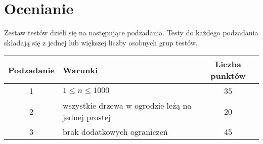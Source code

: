 \documentclass[10pt]{article}
\begin{document}

    \section*{Ocenianie}
        
    Zestaw testów dzieli się na następujące podzadania. Testy do każdego podzadania składają się z jednej lub większej liczby osobnych grup testów.
    
    \begin{center}
        \begin{tabular}{ |c|p{9cm}|c| }
            \hline
            \textbf{Podzadanie} & \textbf{Warunki} & \textbf{Liczba punktów}\\
            \hline
            1 & $1\leq n\leq 1000$ & 35\\
            \hline
            2 & wszystkie drzewa w ogrodzie leżą na jednej prostej & 20\\
            \hline
            3 & brak dodatkowych ograniczeń & 45\\
            \hline
        \end{tabular}
    \end{center}
\end{document}
